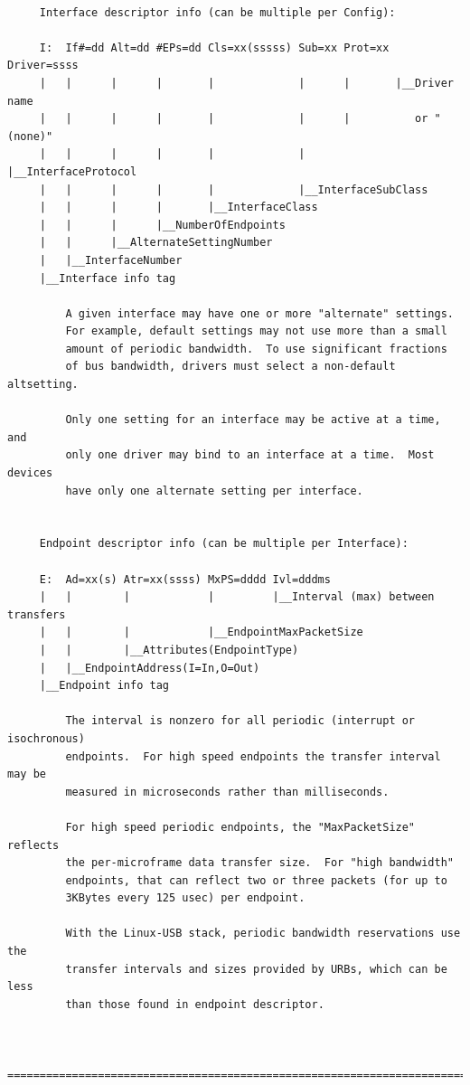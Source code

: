 {{{{{{{{{{{{{{{{{\begin{verbatim}
     
     Interface descriptor info (can be multiple per Config):
     
     I:  If#=dd Alt=dd #EPs=dd Cls=xx(sssss) Sub=xx Prot=xx Driver=ssss
     |   |      |      |       |             |      |       |__Driver name
     |   |      |      |       |             |      |          or "(none)"
     |   |      |      |       |             |      |__InterfaceProtocol
     |   |      |      |       |             |__InterfaceSubClass
     |   |      |      |       |__InterfaceClass
     |   |      |      |__NumberOfEndpoints
     |   |      |__AlternateSettingNumber
     |   |__InterfaceNumber
     |__Interface info tag
     
         A given interface may have one or more "alternate" settings.
         For example, default settings may not use more than a small
         amount of periodic bandwidth.  To use significant fractions
         of bus bandwidth, drivers must select a non-default altsetting.
     
         Only one setting for an interface may be active at a time, and
         only one driver may bind to an interface at a time.  Most devices
         have only one alternate setting per interface.
     
     
     Endpoint descriptor info (can be multiple per Interface):
     
     E:  Ad=xx(s) Atr=xx(ssss) MxPS=dddd Ivl=dddms
     |   |        |            |         |__Interval (max) between transfers
     |   |        |            |__EndpointMaxPacketSize
     |   |        |__Attributes(EndpointType)
     |   |__EndpointAddress(I=In,O=Out)
     |__Endpoint info tag
     
         The interval is nonzero for all periodic (interrupt or isochronous)
         endpoints.  For high speed endpoints the transfer interval may be
         measured in microseconds rather than milliseconds.
     
         For high speed periodic endpoints, the "MaxPacketSize" reflects
         the per-microframe data transfer size.  For "high bandwidth"
         endpoints, that can reflect two or three packets (for up to
         3KBytes every 125 usec) per endpoint.
     
         With the Linux-USB stack, periodic bandwidth reservations use the
         transfer intervals and sizes provided by URBs, which can be less
         than those found in endpoint descriptor.
     
     
     =======================================================================
     

\end{verbatim}}}}}}}}}}}}}}}}}}
